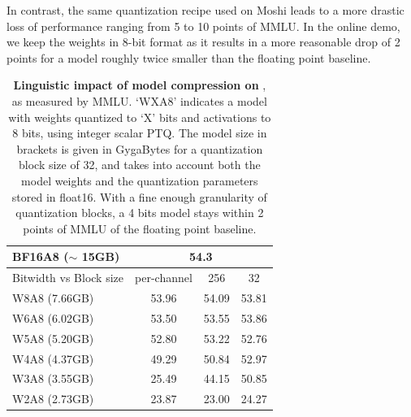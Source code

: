 In contrast, the same quantization recipe used on Moshi leads to a more drastic loss of performance ranging from 5 to 10 points of MMLU.
In the online demo, we keep the weights in 8-bit format as it results in a more reasonable drop of 2 points for a model roughly twice smaller than the floating point baseline.
\begin{table}[t]
    \caption{\label{tab:quanthelium}\textbf{Linguistic impact of model compression on \helium}, as measured by MMLU. `WXA8' indicates a model with weights quantized to `X' bits and activations to 8 bits, using integer scalar PTQ.  The model size in brackets is given in GygaBytes for a quantization block size of 32,  and takes into account both the model weights and the quantization parameters stored in float16.
    With a fine enough granularity of quantization blocks, a 4 bits model stays within 2 points of MMLU of the floating point baseline. 
    }
    \footnotesize
    \centering
    \begin{tabular}{lccc}
        \toprule
       BF16A8 ($\sim$ 15GB)& \multicolumn{3}{c}{54.3} \\
        \midrule
        Bitwidth vs Block size & per-channel & 256 & 32 \\
        \midrule
         W8A8  (7.66GB) &  53.96 & 54.09 & 53.81\\
         W6A8 (6.02GB)  &  53.50&  53.55&  53.86\\
         W5A8  (5.20GB) &  52.80&  53.22& 52.76\\
         W4A8 (4.37GB)  & 49.29 & 50.84 & 52.97 \\
         W3A8 (3.55GB) & 25.49 & 44.15 & 50.85\\
         W2A8 (2.73GB)  & 23.87 &23.00 & 24.27\\
    \bottomrule
    \end{tabular}
\end{table}

